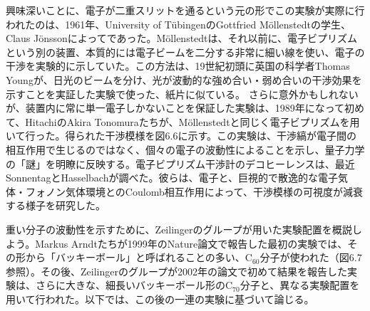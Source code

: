 興味深いことに、電子が二重スリットを通るという元の形でこの実験が実際に行われたのは、1961年、University of TübingenのGottfried Möllenstedtの学生、Claus Jönsson\cite{ref258,ref259}によってであった。Möllenstedtは、それ以前に、電子ビプリズムという別の装置、本質的には電子ビームを二分する非常に細い線を使い、電子の干渉を実験的に示していた。この方法は、19世紀初頭に英国の科学者Thomas Youngが、日光のビームを分け、光が波動的な強め合い・弱め合いの干渉効果を示すことを実証した実験\cite{ref260}で使った、紙片に似ている。
\hypertarget{srcpage:259}{}\label{srcpage:259}
さらに意外かもしれないが、装置内に常に単一電子しかないことを保証した実験は、1989年になって初めて、HitachiのAkira Tonomuraたちが、Möllenstedtと同じく電子ビプリズムを用いて行った\cite{ref261}。得られた干渉模様を図6.6に示す。この実験は、干渉縞が電子間の相互作用で生じるのではなく、個々の電子の波動性によることを示し、量子力学の「謎」を明瞭に反映する。電子ビプリズム干渉計のデコヒーレンスは、最近SonnentagとHasselbach\cite{ref262}が調べた。彼らは、電子と、巨視的で散逸的な電子気体・フォノン気体環境とのCoulomb相互作用によって、干渉模様の可視度が減衰する様子を研究した。

重い分子の波動性を示すために、Zeilingerのグループが用いた実験配置を概説しよう。Markus Arndtたち\cite{ref263}が1999年のNature論文で報告した最初の実験では、その形から「バッキーボール」と呼ばれることの多い、$\mathrm C_{60}$分子が使われた（図6.7参照）。その後、Zeilingerのグループが2002年の論文\cite{ref264}で初めて結果を報告した実験は、さらに大きな、細長いバッキーボール形の$\mathrm C_{70}$分子と、異なる実験配置\cite{ref264,ref265,ref266,ref267}を用いて行われた。以下では、この後の一連の実験に基づいて論じる。
